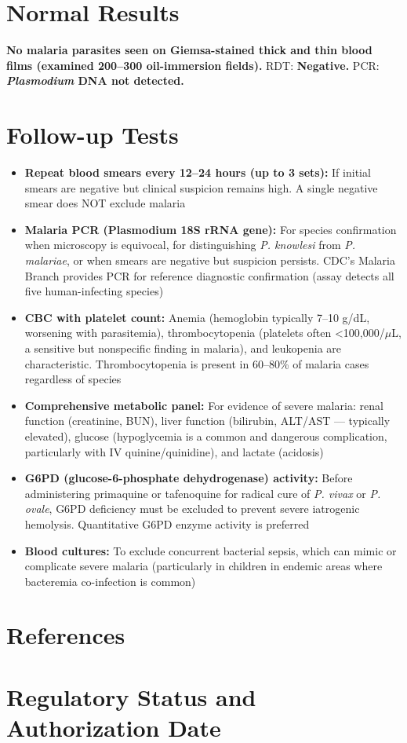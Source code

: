 \section*{Normal Results}
\textbf{No malaria parasites seen on Giemsa-stained thick and thin blood films (examined 200--300 oil-immersion fields).} RDT: \textbf{Negative.} PCR: \textbf{\textit{Plasmodium} DNA not detected.}

\section*{Follow-up Tests}
\begin{itemize}
  \item \textbf{Repeat blood smears every 12--24 hours (up to 3 sets):} If initial smears are negative but clinical suspicion remains high. A single negative smear does NOT exclude malaria
  \item \textbf{Malaria PCR (Plasmodium 18S rRNA gene):} For species confirmation when microscopy is equivocal, for distinguishing \textit{P. knowlesi} from \textit{P. malariae}, or when smears are negative but suspicion persists. CDC's Malaria Branch provides PCR for reference diagnostic confirmation (assay detects all five human-infecting species)
  \item \textbf{CBC with platelet count:} Anemia (hemoglobin typically 7--10 g/dL, worsening with parasitemia), thrombocytopenia (platelets often <100,000/$\mu$L, a sensitive but nonspecific finding in malaria), and leukopenia are characteristic. Thrombocytopenia is present in 60--80\% of malaria cases regardless of species
  \item \textbf{Comprehensive metabolic panel:} For evidence of severe malaria: renal function (creatinine, BUN), liver function (bilirubin, ALT/AST --- typically elevated), glucose (hypoglycemia is a common and dangerous complication, particularly with IV quinine/quinidine), and lactate (acidosis)
  \item \textbf{G6PD (glucose-6-phosphate dehydrogenase) activity:} Before administering primaquine or tafenoquine for radical cure of \textit{P. vivax} or \textit{P. ovale}, G6PD deficiency must be excluded to prevent severe iatrogenic hemolysis. Quantitative G6PD enzyme activity is preferred
  \item \textbf{Blood cultures:} To exclude concurrent bacterial sepsis, which can mimic or complicate severe malaria (particularly in children in endemic areas where bacteremia co-infection is common)
\end{itemize}

\section*{References}



\clearpage
\section*{Regulatory Status and Authorization Date}

\clearpage
